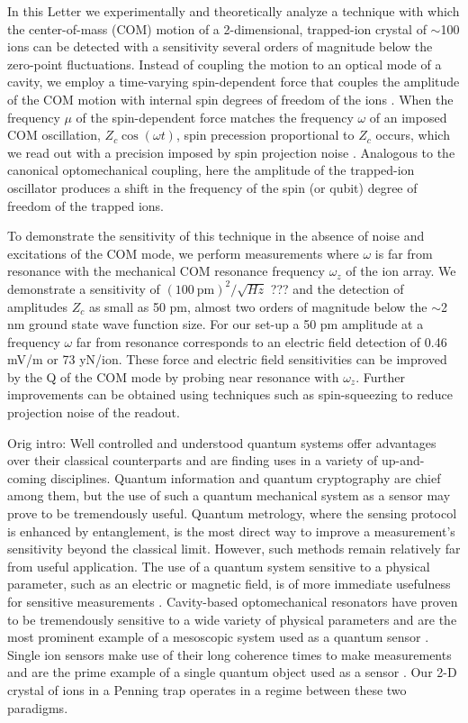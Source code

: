 \documentclass[aps,prl,twocolumn,superscriptaddress,floatfix]{revtex4-1}
\begin{document}
In this Letter we experimentally and theoretically analyze a technique with which the center-of-mass (COM) motion of a 2-dimensional, trapped-ion crystal of $\sim$100 ions can be detected with a sensitivity several orders of magnitude below the zero-point fluctuations. Instead of coupling the motion to an optical mode of a cavity, we employ a time-varying spin-dependent force that couples the amplitude of the COM motion with internal spin degrees of freedom of the ions \citep{Sawyer2014,Ivanov2016}. When the frequency $\mu$ of the spin-dependent force matches the frequency $\omega$ of an imposed COM oscillation, $Z_{c}\cos\left(\omega t\right)$, spin precession proportional to $Z_{c}$ occurs, which we read out with a precision imposed by spin projection noise \citep{Itano1993}. Analogous to the canonical optomechanical coupling, here the amplitude of the trapped-ion oscillator produces a shift in the frequency of the spin (or qubit) degree of freedom of the trapped ions.

To demonstrate the sensitivity of this technique in the absence of noise and excitations of the COM mode, we perform measurements where $\omega$ is far from resonance with the mechanical COM resonance frequency $\omega_{z}$ of the ion array. We demonstrate a sensitivity of $(100\:\mathrm{pm})^{2}/\sqrt{Hz}$ ??? and the detection of amplitudes $Z_{c}$ as small as 50 pm, almost two orders of magnitude below the $\sim$2 nm ground state wave function size. For our set-up a 50 pm amplitude at a frequency $\omega$ far from resonance corresponds to an electric field detection of 0.46 mV/m  or 73 yN/ion. These force and electric field sensitivities can be improved by the Q of the COM mode by probing near resonance with $\omega_z$.  Further improvements can be obtained using techniques such as spin-squeezing \citep{Bohnet2015} to reduce projection noise of the readout.

\iffalse
Orig intro:
Well controlled and understood quantum systems offer advantages over their classical counterparts and are finding uses in a variety of up-and-coming disciplines. Quantum information and quantum cryptography are chief among them, but the use of such a quantum mechanical system as a sensor may prove to be tremendously useful. Quantum metrology, where the sensing protocol is enhanced by entanglement, is the most direct way to improve a measurement's sensitivity beyond the classical limit. However, such methods remain relatively far from useful application. The use of a quantum system sensitive to a physical parameter, such as an electric or magnetic field, is of more immediate usefulness for sensitive measurements \citep{Degen2016}. Cavity-based optomechanical resonators have proven to be tremendously sensitive to a wide variety of physical parameters and are the most prominent example of a mesoscopic system used as a quantum sensor \citep{Clark2016,Kampel2016,Kim2016a,Schreppler2014a}. Single ion sensors make use of their long coherence times to make measurements and are the prime example of a single quantum object used as a sensor \citep{Shaniv2016,Ivanov2016a,Knunz2010}. Our 2-D crystal of ions in a Penning trap operates in a regime between these two paradigms.
 
\end{document}

